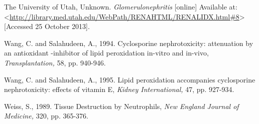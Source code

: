 \documentclass[11pt]{report}
\begin{document}
The University of Utah, Unknown. \textit{Glomerulonephritis} [online] Available at: <\url{http://library.med.utah.edu/WebPath/RENAHTML/RENALIDX.html#8}> [Accessed 25 October 2013].
\newline
\newline

Wang, C. and Salahudeen, A., 1994. Cyclosporine nephrotoxicity: attenuation by an antioxidant -inhibitor of lipid peroxidation in-vitro and in-vivo, \textit{Transplantation,} 58, pp. 940-946.
\newline
\newline

Wang, C. and Salahudeen, A., 1995. Lipid peroxidation accompanies cyclosporine nephrotoxicity: effects of vitamin E, \textit{Kidney International,} 47, pp. 927-934.
\newline
\newline

Weiss, S., 1989. Tissue Destruction by Neutrophils, \textit{New England Journal of Medicine,} 320, pp. 365-376.
\newline
\newline
\end{document}
